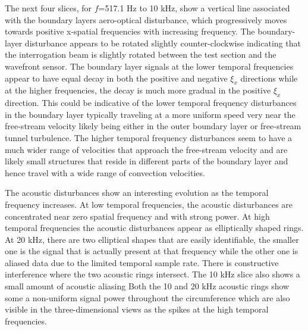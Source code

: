 The next four slices, for $f$=517.1 Hz to 10 kHz, show a vertical line associated with the boundary layers aero-optical disturbance, which  progressively moves towards positive x-spatial frequencies with increasing frequency.
The boundary-layer disturbance appears to be rotated slightly counter-clockwise indicating that the interrogation beam is slightly rotated between the test section and the wavefront sensor.
The boundary layer signals at the lower temporal frequencies appear to have equal decay in both the positive and negative $\xi_x$ directions while at the higher frequencies, the decay is much more gradual in the positive $\xi_x$ direction.
This could be indicative of the lower temporal frequency disturbances in the boundary layer typically traveling at a more uniform speed very near the free-stream velocity likely being either in the outer boundary layer or free-stream tunnel turbulence.
The higher temporal frequency disturbances seem to have a much wider range of velocities that approach the free-stream velocity and are likely small structures that reside in different parts of the boundary layer and hence travel with a wide range of convection velocities.

The acoustic disturbances show an interesting evolution as the temporal frequency increases.
At low temporal frequencies, the acoustic disturbances are concentrated near zero spatial frequency and with strong power.
At high temporal frequencies the acoustic disturbances appear as elliptically shaped rings.
At 20 kHz, there are two elliptical shapes that are easily identifiable, the smaller one is the signal that is actually present at that frequency while the other one is aliased data due to the limited temporal sample rate.
There is constructive interference where the two acoustic rings intersect.
The 10 kHz slice also shows a small amount of acoustic aliasing
Both the 10 and 20 kHz acoustic rings show some a non-uniform signal power throughout the circumference which are also visible in the three-dimensional views as the spikes at the high temporal frequencies.

